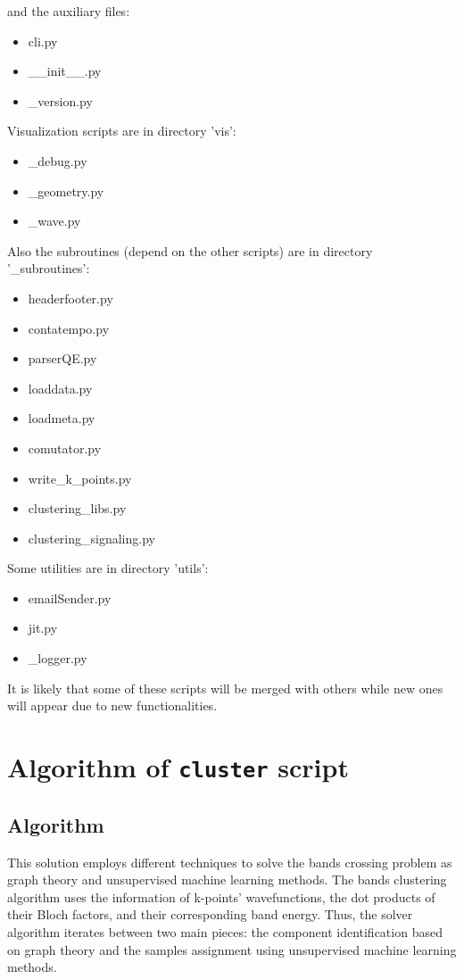 \documentclass[a4paper,12pt]{report}
\begin{document}
\begin{appendices}
and the auxiliary files:
\begin{itemize}
  \item cli.py
  \item \_\_init\_\_.py
  \item \_version.py
\end{itemize}\medskip


Visualization scripts are in directory 'vis':
\begin{itemize}
 \item \_debug.py
 \item \_geometry.py
 \item \_wave.py
\end{itemize}\medskip

Also the subroutines (depend on the other scripts) are in directory '\_subroutines':
\begin{itemize}
 \item headerfooter.py
 \item contatempo.py
 \item parserQE.py
 \item loaddata.py
 \item loadmeta.py
 \item comutator.py
 \item write\_k\_points.py
 \item clustering\_libs.py
 \item clustering\_signaling.py
\end{itemize}

Some utilities are in directory 'utils':
\begin{itemize}
  \item emailSender.py
  \item jit.py
  \item \_logger.py
\end{itemize}

It is likely that some of these scripts will be merged with others
while new ones will appear due to new functionalities.






\chapter{Algorithm of \texttt{cluster} script}
\label{cha:cluster}


    \section{Algorithm}
    This solution employs different techniques to solve the bands crossing problem as graph theory and unsupervised machine learning methods.
    The bands clustering algorithm uses the information of k-points' wavefunctions, the dot products of their Bloch factors, and their corresponding band energy.
    Thus, the solver algorithm iterates between two main pieces: the component identification based on graph theory and the samples assignment using unsupervised machine learning methods.


\end{appendices}
\end{document}
